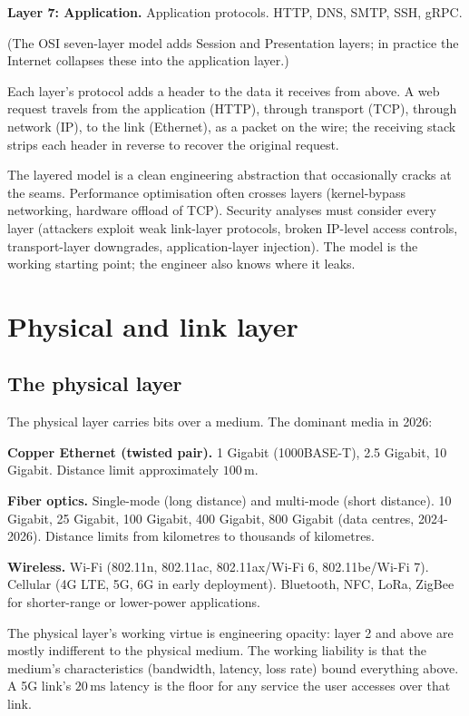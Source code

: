 \textbf{Layer 7: Application.} Application protocols. HTTP, DNS, SMTP, SSH, gRPC.

(The OSI seven-layer model adds Session and Presentation layers; in practice the Internet collapses these into the application layer.)

Each layer's protocol adds a header to the data it receives from above. A web request travels from the application (HTTP), through transport (TCP), through network (IP), to the link (Ethernet), as a packet on the wire; the receiving stack strips each header in reverse to recover the original request.

The layered model is a clean engineering abstraction that occasionally cracks at the seams. Performance optimisation often crosses layers (kernel-bypass networking, hardware offload of TCP). Security analyses must consider every layer (attackers exploit weak link-layer protocols, broken IP-level access controls, transport-layer downgrades, application-layer injection). The model is the working starting point; the engineer also knows where it leaks.

\section{Physical and link layer}

\subsection{The physical layer}

The physical layer carries bits over a medium. The dominant media in 2026:

\textbf{Copper Ethernet (twisted pair).} 1 Gigabit (1000BASE-T), 2.5 Gigabit, 10 Gigabit. Distance limit approximately $100\,\si{\meter}$.

\textbf{Fiber optics.} Single-mode (long distance) and multi-mode (short distance). 10 Gigabit, 25 Gigabit, 100 Gigabit, 400 Gigabit, 800 Gigabit (data centres, 2024-2026). Distance limits from kilometres to thousands of kilometres.

\textbf{Wireless.} Wi-Fi (802.11n, 802.11ac, 802.11ax/Wi-Fi 6, 802.11be/Wi-Fi 7). Cellular (4G LTE, 5G, 6G in early deployment). Bluetooth, NFC, LoRa, ZigBee for shorter-range or lower-power applications.

The physical layer's working virtue is engineering opacity: layer 2 and above are mostly indifferent to the physical medium. The working liability is that the medium's characteristics (bandwidth, latency, loss rate) bound everything above. A 5G link's $20\,\si{\milli\second}$ latency is the floor for any service the user accesses over that link.

